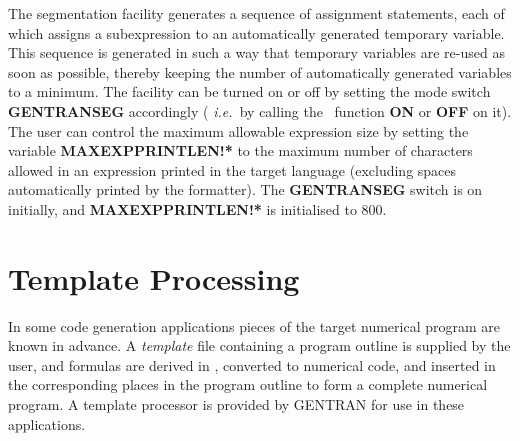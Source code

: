 The segmentation facility generates a sequence of assignment
statements, each of which assigns a subexpression to an automatically
generated temporary variable.  This sequence is generated in such a
way that temporary variables are re-used as soon as possible, thereby
keeping the number of automatically generated variables to a minimum.
The facility can be turned on or off by setting the mode
 switch {\bf GENTRANSEG} accordingly ({\em
i.e.\ }by calling the \REDUCE\ function {\bf ON} or {\bf OFF} on it).  The user
can control the maximum allowable expression size by setting the
variable {\bf MAXEXPPRINTLEN!*} to the maximum number of characters
allowed in an expression printed in the target language (excluding
spaces automatically printed by the formatter).  The {\bf GENTRANSEG}
switch is on initially, and {\bf MAXEXPPRINTLEN!*} is initialised to
800.

\section{Template Processing}\label{GENTRAN:template}

In some code generation applications pieces of the target numerical
program are known in advance.  A {\it template} file containing a
program outline is supplied by the user, and formulas are derived in
\REDUCE, converted to numerical code, and inserted in the corresponding
places in the program outline to form a complete numerical program.  A
template processor is provided by GENTRAN for use in these
applications.

